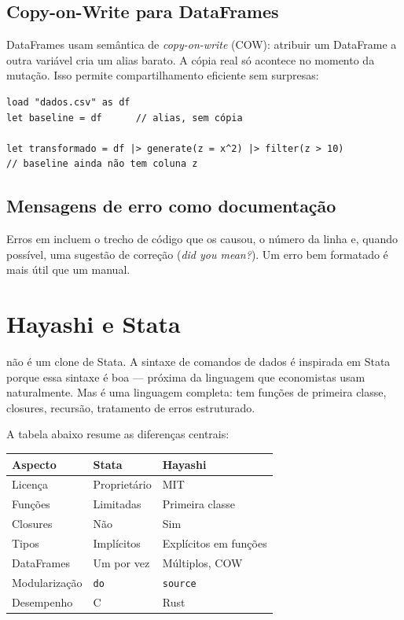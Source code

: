\subsection*{Copy-on-Write para DataFrames}

DataFrames usam semântica de \textit{copy-on-write} (COW): atribuir um DataFrame a
outra variável cria um alias barato. A cópia real só acontece no momento da mutação.
Isso permite compartilhamento eficiente sem surpresas:

\begin{lstlisting}[caption={COW em ação}]
load "dados.csv" as df
let baseline = df      // alias, sem cópia

let transformado = df |> generate(z = x^2) |> filter(z > 10)
// baseline ainda não tem coluna z
\end{lstlisting}

\subsection*{Mensagens de erro como documentação}

Erros em \hayashi{} incluem o trecho de código que os causou, o número da linha e, quando
possível, uma sugestão de correção (\textit{did you mean?}). Um erro bem formatado é
mais útil que um manual.

\section{Hayashi e Stata}

\hayashi{} não é um clone de Stata. A sintaxe de comandos de dados é inspirada em Stata
porque essa sintaxe é boa — próxima da linguagem que economistas usam naturalmente.
Mas \hayashi{} é uma linguagem completa: tem funções de primeira classe, closures,
recursão, tratamento de erros estruturado.

A tabela abaixo resume as diferenças centrais:

\begin{center}
\begin{tabular}{lll}
\toprule
\textbf{Aspecto} & \textbf{Stata} & \textbf{Hayashi} \\
\midrule
Licença          & Proprietário    & MIT \\
Funções          & Limitadas       & Primeira classe \\
Closures         & Não             & Sim \\
Tipos            & Implícitos      & Explícitos em funções \\
DataFrames       & Um por vez      & Múltiplos, COW \\
Modularização    & \texttt{do}     & \lstinline{source} \\
Desempenho       & C              & Rust \\
\bottomrule
\end{tabular}
\end{center}

